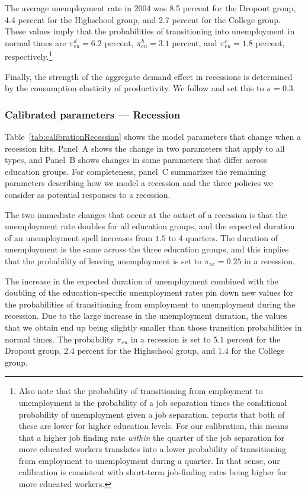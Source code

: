 \documentclass[\econtexRoot/HAFiscal]{subfiles}
\begin{document}
The average unemployment rate in 2004 was 8.5 percent for the Dropout group, 4.4 percent for the Highschool group, and 2.7 percent for the College group.
These values imply that the probabilities of transitioning into unemployment in normal times are $\pi_{eu}^d=6.2$ percent, $\pi_{eu}^h=3.1$ percent, and $\pi_{eu}^c=1.8$ percent, respectively.\footnote{Also note that the probability of transitioning from employment to unemployment is the probability of a job separation times the conditional probability of unemployment given a job separation.
\citet{mincer1991education} reports that both of these are lower for higher education levels.
For our calibration, this means that a higher job finding rate \textit{within} the quarter of the job separation for more educated workers translates	into a lower probability of transitioning from employment to unemployment during a quarter.
In that sense, our calibration is consistent with short-term job-finding rates being higher for more educated workers.}

Finally, the strength of the aggregate demand effect in recessions is determined by the consumption elasticity of productivity.
We follow \cite{kmpHandbook2016} and set this to $\kappa=0.3$.


\subsubsection{Calibrated parameters --- Recession} 
\notinsubfile{\label{sec:calibRecession}}

Table~\ref{tab:calibrationRecession} shows the model parameters that change when a recession hits. Panel~A shows the change in two parameters that apply to all types, and Panel~B shows changes in some parameters that differ across education groups. For completeness, panel~C summarizes the remaining parameters describing how we model a recession and the three policies we consider as potential responses to a recession.

The two immediate changes that occur at the outset of a recession is that the unemployment rate doubles for all education groups, and the expected duration of an unemployment spell increases from $1.5$ to $4$ quarters. The duration of unemployment is the same across the three education groups, and this implies that the probability of leaving unemployment is set to $\pi_{ue} = 0.25$ in a recession. 

The increase in the expected duration of unemployment combined with the doubling of the education-specific unemployment rates pin down new values for the probabilities of transitioning from employment to unemployment during the recession. Due to the large increase in the unemployment duration, the values that we obtain end up being slightly smaller than those transition probabilities in normal times. The probability $\pi_{eu}$ in a recession is set to $5.1$ percent for the Dropout group, $2.4$ percent for the Highschool group, and $1.4$ for the College group. 
\end{document}
